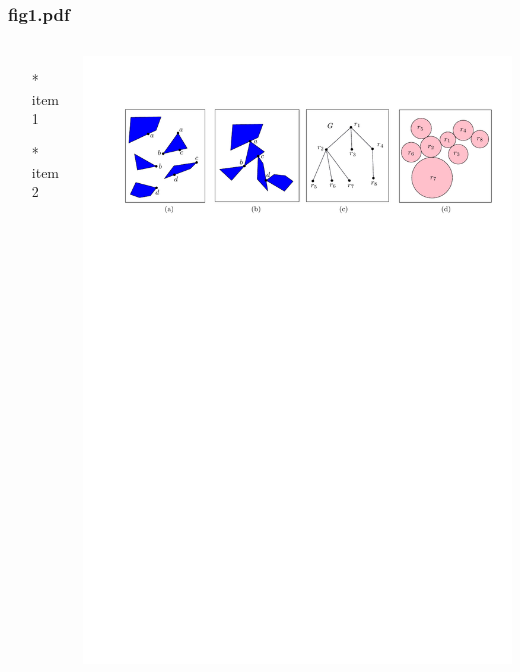 \begin{frame} \frametitle{fig1.pdf}
    \begin{columns}[c]
        \begin{itemize}
            \item[*] item 1
            \item[*] item 2
        \end{itemize}
        \begin{minipage}{\linewidth}
            \begin{center}
            \includegraphics[width=.9\textwidth]{graphics/fig1.pdf}
            \label{gfx:fig1.pdf}
            \end{center}
        \end{minipage}
    \end{columns}
\end{frame}
